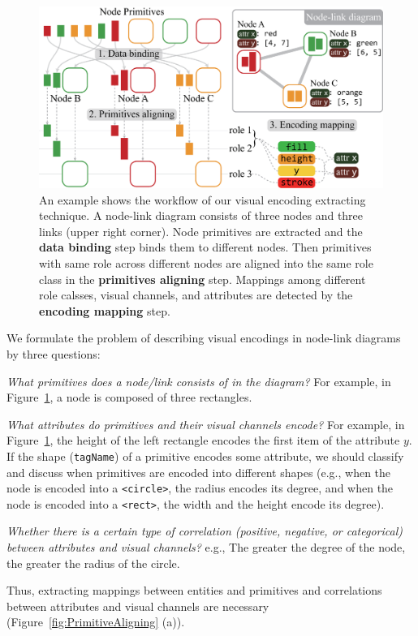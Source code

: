\begin{figure}
    \centering
    \includegraphics[width=1\columnwidth]{figures/VisualEncodings.eps}
    \caption{An example shows the workflow of our visual encoding extracting technique. A node-link diagram consists of three nodes and three links (upper right corner). Node primitives are extracted and the \textbf {data binding} step binds them to different nodes. Then primitives with same role across different nodes are aligned into the same role class in the \textbf{primitives aligning} step. Mappings among different role calsses, visual channels, and attributes are detected by the \textbf{encoding mapping} step.}
    \label{fig:VisualEncodings}
\end{figure}

We formulate the problem of describing visual encodings in node-link diagrams by three questions:
\begin{compactenum}[\textbf{Q}1]
    \item \textit{What primitives does a node/link consists of in the diagram?} For example, in Figure~\ref{fig:VisualEncodings}, a node is composed of three rectangles. \label{qstn:composition}
    
    \item \textit{What attributes do primitives and their visual channels encode?} For example, in Figure~\ref{fig:VisualEncodings}, the height of the left rectangle encodes the first item of the attribute $y$. If the shape (\texttt{tagName}) of a primitive encodes some attribute, we should classify and discuss when primitives are encoded into different shapes (e.g., when the node is encoded into a \texttt{<circle>}, the radius encodes its degree, and when the node is encoded into a \texttt{<rect>}, the width and the height encode its degree). \label{qstn:encodings}
    
    \item \textit{Whether there is a certain type of correlation (positive, negative, or categorical) between attributes and visual channels?} e.g., The greater the degree of the node, the greater the radius of the circle.\label{qstn:correlation}
\end{compactenum}
Thus, extracting mappings between entities and primitives and correlations between attributes and visual channels are necessary (Figure~\ref{fig:PrimitiveAligning} (a)).


